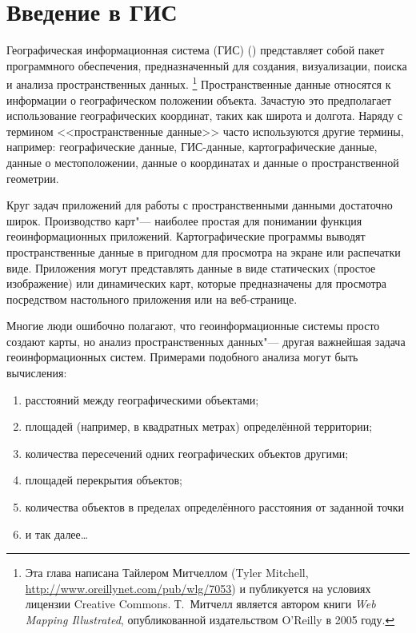 \pagestyle{scrheadings}
\chapter{Введение в ГИС}\label{label_intro}


Географическая информационная система (ГИС) (\cite{mitchel05}) представляет
собой пакет программного обеспечения, предназначенный для
создания, визуализации, поиска и анализа пространственных данных.
\footnote{Эта глава написана Тайлером Митчеллом (Tyler Mitchell,
\url{http://www.oreillynet.com/pub/wlg/7053}) и публикуется на условиях
лицензии Creative Commons. Т.~Митчелл является автором книги
\textit{Web Mapping Illustrated}, опубликованной издательством O'Reilly
в 2005 году.}
Пространственные данные относятся к информации о географическом положении
объекта. Зачастую это предполагает использование географических координат,
таких как широта и долгота. Наряду с термином <<пространственные данные>> часто
используются другие термины, например: географические данные, ГИС-данные,
картографические данные, данные о местоположении, данные о координатах
и данные о пространственной геометрии.

Круг задач приложений для работы с пространственными данными достаточно широк.
Производство карт"--- наиболее простая для понимании функция
геоинформационных приложений. Картографические программы выводят
пространственные данные в пригодном для просмотра на экране или распечатки виде.
Приложения могут представлять данные в виде статических (простое изображение) или
динамических карт, которые предназначены для просмотра посредством
настольного приложения или на веб-странице.

Многие люди ошибочно полагают, что геоинформационные системы просто
создают карты, но анализ пространственных данных"--- другая важнейшая
задача геоинформационных систем. Примерами подобного анализа
могут быть вычисления:

\begin{enumerate}
\item расстояний между географическими объектами;
\item площадей (например, в квадратных метрах) определённой территории;
\item количества пересечений одних географических объектов другими;
\item площадей перекрытия объектов;
\item количества объектов в пределах определённого расстояния от заданной точки
\item и так далее\ldots
\end{enumerate}

